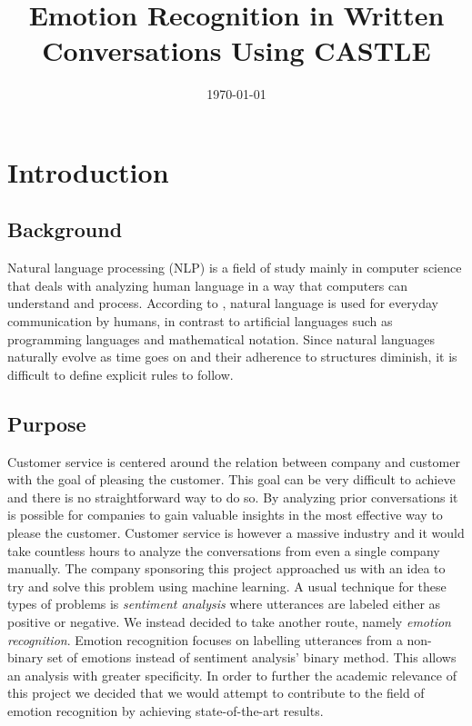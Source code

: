 \documentclass[nofilelist]{cslthse-msc}
\title{Emotion Recognition in Written Conversations Using CASTLE}
\subtitle{\protect\icon{CASTLE}}
\date{\today}
\begin{document}
\renewcommand{\bibname}{References}

\makefrontmatter
\chapter{Introduction}


\section{Background}
Natural language processing (NLP) is a field of study mainly in computer science that deals with analyzing human language in a way that computers can understand and process. According to \citet{ntlk2009}, natural language is used for everyday communication by humans, in contrast to artificial languages such as programming languages and mathematical notation. Since natural languages naturally evolve as time goes on and their adherence to structures diminish, it is difficult to define explicit rules to follow. 






\section{Purpose}
Customer service is centered around the relation between company and customer with the goal of pleasing the customer. This goal can be very difficult to achieve and there is no straightforward way to do so. By analyzing prior conversations it is possible for companies to gain valuable insights in the most effective way to please the customer. Customer service is however a massive industry and it would take countless hours to analyze the conversations from even a single company manually. 
The company sponsoring this project approached us with an idea to try and solve this problem using machine learning. A usual technique for these types of problems is \textit{sentiment analysis} where utterances are labeled either as positive or negative. We instead decided to take another route, namely \textit{emotion recognition}. Emotion recognition focuses on labelling utterances from a non-binary set of emotions instead of sentiment analysis' binary method. This allows an analysis with greater specificity.   
In order to further the academic relevance of this project we decided that we would attempt to contribute to the field of emotion recognition by achieving state-of-the-art results. 
\end{document}
